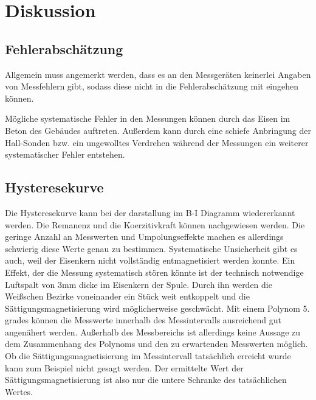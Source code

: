 \section{Diskussion}


\subsection{Fehlerabschätzung}
Allgemein muss angemerkt werden, dass es an den Messgeräten keinerlei Angaben von Messfehlern gibt,
sodass diese nicht in die Fehlerabschätzung mit eingehen können.

\noindent
Mögliche systematische Fehler in den Messungen können durch das Eisen im Beton des Gebäudes auftreten.
Außerdem kann durch eine schiefe Anbringung der Hall-Sonden bzw. ein ungewolltes Verdrehen während der Messungen
ein weiterer systematischer Fehler entstehen. 


\subsection{Hysteresekurve}
Die Hysteresekurve kann bei der darstallung im B-I Diagramm wiedererkannt werden.
Die Remanenz und die Koerzitivkraft können nachgewiesen werden.
Die geringe Anzahl an Messwerten und Umpolungseffekte machen es allerdings schwierig diese Werte genau zu bestimmen.
Systematische Unsicherheit gibt es auch, weil der Eisenkern nicht vollständig entmagnetisiert werden konnte.
Ein Effekt, der die Messung systematisch stören könnte ist der technisch notwendige Luftspalt von 3mm dicke im Eisenkern der Spule.
Durch ihn werden die Weißschen Bezirke voneinander ein Stück weit entkoppelt und die Sättigungsmagnetisierung wird möglicherweise geschwächt.
Mit einem Polynom 5. grades können die Messwerte innerhalb des Messintervalls ausreichend gut angenähert werden.
Außerhalb des Messbereichs ist allerdings keine Aussage zu dem Zusammenhang des Polynoms und den zu erwartenden Messwerten möglich.
Ob die Sättigungsmagnetisierung im Messintervall tatsächlich erreicht wurde kann zum Beispiel nicht gesagt werden.
Der ermittelte Wert der Sättigungsmagnetisierung ist also nur die untere Schranke des tatsächlichen Wertes.




